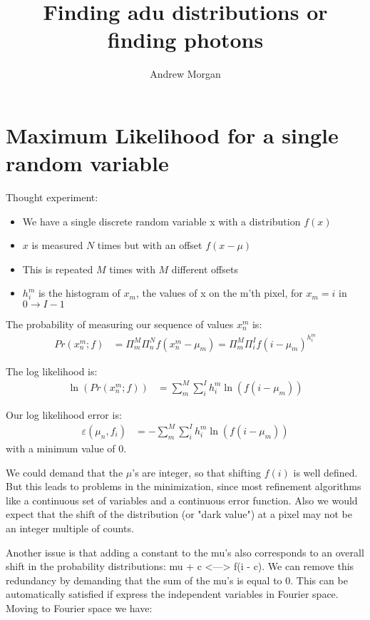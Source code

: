 \documentclass[11pt]{article}
\title{\textbf{Finding adu distributions or finding photons}}
\author{Andrew Morgan}
\date{}
\begin{document}
\maketitle

\section{Maximum Likelihood for a single random variable}
Thought experiment:

\begin{itemize}

  \item We have a single discrete random variable x with a distribution $f(x)$
  \item $x$ is measured $N$ times but with an offset $f(x - \mu)$
  \item This is repeated $M$ times with $M$ different offsets
  \item $h^m_i$ is the histogram of $x_m$, the values of x on the m'th pixel, for $x_m = i$ in $0 \rightarrow I-1$

\end{itemize}


The probability of measuring our sequence of values $ x^m_n $ is:
\begin{align}
   Pr(x^m_n; f) &= \Pi_m^M \Pi_n^N f(x^m_n - \mu_m) = \Pi_m^M \Pi_i^I f(i - \mu_m)^{h^m_i}
\end{align}

The log likelihood is:
\begin{align}
   \ln(Pr(x^m_n; f)) &= \sum_m^M \sum_i^I h^m_i \ln(f(i - \mu_m))
\end{align}

Our log likelihood error is:
\begin{align}
   \varepsilon(\mu_n, f_i) &= -\sum_m^M \sum_i^I h^m_i \ln(f(i - \mu_m))
\end{align}
with a minimum value of 0. 

We could demand that the $\mu$'s are integer, so that shifting $f(i)$ is well defined. But this leads to problems in the minimization, since most refinement algorithms like a continuous set of variables and a continuous error function. Also we would expect that the shift of the distribution (or "dark value") at a pixel may not be an integer multiple of counts. 

Another issue is that adding a constant to the mu's also corresponds to an overall shift in the probability distributions: mu + c <---> f(i - c). We can remove this redundancy by demanding that the sum of the mu's is equal to 0. This can be automatically satisfied if express the independent variables in Fourier space. Moving to Fourier space we have:
\end{document}
